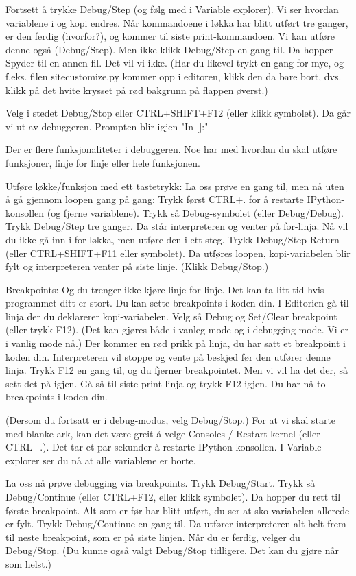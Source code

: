 {Fortsett å trykke Debug/Step (og følg med i Variable explorer).
Vi ser hvordan variablene i og kopi endres.
Når kommandoene i løkka har blitt utført tre ganger, er den ferdig (hvorfor?),
og kommer til siste print-kommandoen.
Vi kan utføre denne også (Debug/Step).
Men ikke klikk Debug/Step en gang til. Da hopper Spyder til en annen fil.
Det vil vi ikke.
(Har du likevel trykt en gang for mye, og f.eks. filen sitecustomize.py
kommer opp i editoren, klikk den da bare bort, dvs. klikk på det hvite
krysset på rød bakgrunn på flappen øverst.)

Velg i stedet Debug/Stop eller CTRL+SHIFT+F12 (eller klikk symbolet).
Da går vi ut av debuggeren.
Prompten blir igjen "In []:"


Der er flere funksjonaliteter i debuggeren.
Noe har med hvordan du skal utføre funksjoner, linje for linje eller hele funksjonen.


Utføre løkke/funksjon med ett tastetrykk: 
La oss prøve en gang til, men nå uten å gå gjennom loopen gang på gang:
Trykk først CTRL+. for å restarte IPython-konsollen (og fjerne variablene).
Trykk så Debug-symbolet (eller Debug/Debug).
Trykk Debug/Step tre ganger.
Da står interpreteren og venter på for-linja. 
Nå vil du ikke gå inn i for-løkka, men utføre den i ett steg.
Trykk Debug/Step Return (eller CTRL+SHIFT+F11 eller symbolet).
Da utføres loopen, kopi-variabelen blir fylt og interpreteren venter på siste linje.
(Klikk Debug/Stop.)


Breakpoints: 
Og du trenger ikke kjøre linje for linje.
Det kan ta litt tid hvis programmet ditt er stort. 
Du kan sette breakpoints i koden din.
I Editorien gå til linja der du deklarerer kopi-variabelen.
Velg så Debug og Set/Clear breakpoint (eller trykk F12).
(Det kan gjøres både i vanleg mode og i debugging-mode. Vi er i vanlig mode nå.) 
Der kommer en rød prikk på linja, du har satt et breakpoint i koden din.
Interpreteren vil stoppe og vente på beskjed før den utfører denne linja. 
Trykk F12 en gang til, og du fjerner breakpointet.
Men vi vil ha det der, så sett det på igjen.
Gå så til siste print-linja og trykk F12 igjen.
Du har nå to breakpoints i koden din.

(Dersom du fortsatt er i debug-modus, velg Debug/Stop.)
For at vi skal starte med blanke ark, kan det være greit å velge
Consoles / Restart kernel (eller CTRL+.).
Det tar et par sekunder å restarte IPython-konsollen.
I Variable explorer ser du nå at alle variablene er borte.

La oss nå prøve debugging via breakpoints.
Trykk Debug/Start.
Trykk så Debug/Continue (eller CTRL+F12, eller klikk symbolet). 
Da hopper du rett til første breakpoint. 
Alt som er før har blitt utført, du ser at sko-variabelen allerede er fylt.
Trykk Debug/Continue en gang til.
Da utfører interpreteren alt helt frem til neste breakpoint, som er på siste linjen.
Når du er ferdig, velger du Debug/Stop.
(Du kunne også valgt Debug/Stop tidligere. Det kan du gjøre når som helst.) 


}
